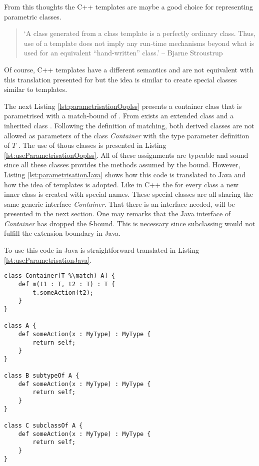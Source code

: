 From this thoughts the C++ templates are maybe a good choice for
representing parametric classes.

\begin{quotation}
`A class generated from a class template is a perfectly ordinary
class. Thus, use of a template does not imply any run-time mechanisms
beyond what is used for an equivalent ``hand-written'' class.' -- Bjarne
Stroustrup \cite{stroustrup_c++_2000}
\end{quotation}

Of course, C++ templates have a different semantics and are not equivalent
with this translation presented for \ooplss but the idea is similar to
create special classes similar to templates.

The next Listing \ref{lst:parametrisationOoplss} presents a container
class that is parametrised with a match-bound of \A. From \A exists an
extended class \B and a inherited class \C. Following the definition
of matching, both derived classes are not allowed as parameters
of the class \emph{Container} with the type parameter definition
of $T$ \match \A.  The use of thous classes is presented in Listing
\ref{lst:useParametrisationOoplss}. All of these assignments are typeable
and sound since all these classes provides the methods assumed by the
bound. However, Listing \ref{lst:parametrisationJava} shows how this code
is translated to Java and how the idea of templates is adopted. Like
in C++ the for every class a new inner class is created with special
names. These special classes are all sharing the same generic interface
\emph{Container}. That there is an interface needed, will be presented
in the next section. One may remarks that the Java interface of
\emph{Container} has dropped the f-bound. This is necessary since
subclassing would not fulfill the extension boundary in Java.

 To use this code in Java is straightforward translated in Listing
\ref{lst:useParametrisationJava}.

\begin{lstlisting}[float,language=ooplss,caption=Parametrisation in \ooplss,label=lst:parametrisationOoplss]
class Container[T %\match) A] {
	def m(t1 : T, t2 : T) : T {
		t.someAction(t2);
	}
}

class A {
	def someAction(x : MyType) : MyType {
		return self;
	}
}

class B subtypeOf A {
	def someAction(x : MyType) : MyType {
		return self;
	}
}

class C subclassOf A {
	def someAction(x : MyType) : MyType {
		return self;
	}
}
\end{lstlisting}

